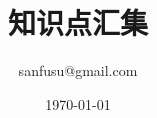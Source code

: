 \documentclass[UTF8]{ctexart}
\begin{document}
\title{知识点汇集}
\date{\today}
\author{sanfusu@gmail.com}
\maketitle




\end{document}
